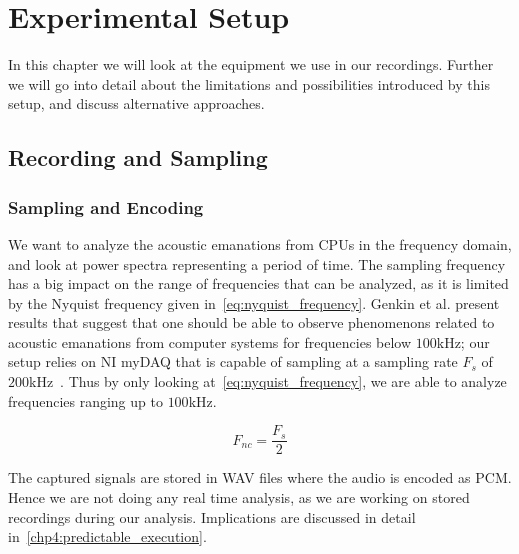 \chapter{Experimental Setup}
\label{chp:experimental_setup}
In this chapter we will look at the equipment we use in our recordings.
Further we will go into detail about the limitations and possibilities introduced by this setup, and discuss alternative approaches.


\section{Recording and Sampling}\label{chp3:sec:microphone_selection}

\subsection{Sampling and Encoding}
We want to analyze the acoustic emanations from CPUs in the frequency domain, and look at power spectra representing a period of time.
The sampling frequency has a big impact on the range of frequencies that can be analyzed, as it is limited by the Nyquist frequency given in~\autoref{eq:nyquist_frequency}.
Genkin et al. present results that suggest that one should be able to observe phenomenons related to acoustic emanations from computer systems for frequencies below \(100\)kHz; our setup relies on \gls{NI} myDAQ that is capable of sampling at a sampling rate \({F_{s}}\) of \(200\)kHz~\footnotemark.
Thus by only looking at~\autoref{eq:nyquist_frequency}, we are able to analyze frequencies ranging up to \(100\)kHz.



\begin{equation}\label{eq:nyquist_frequency}
F_{nc} = \frac{F_{s}}{2}
\end{equation}

The captured signals are stored in WAV files where the audio is encoded as \gls{PCM}.
Hence we are not doing any real time analysis, as we are working on stored recordings during our analysis.
Implications are discussed in detail in~\autoref{chp4:predictable_execution}.


